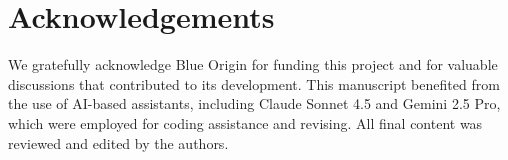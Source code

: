 \section*{Acknowledgements}

We gratefully acknowledge Blue Origin for funding this project and for valuable discussions that contributed to its development.
This manuscript benefited from the use of AI-based assistants, including Claude Sonnet 4.5 and Gemini 2.5 Pro, which were employed for coding assistance and revising. All final content was reviewed and edited by the authors.
